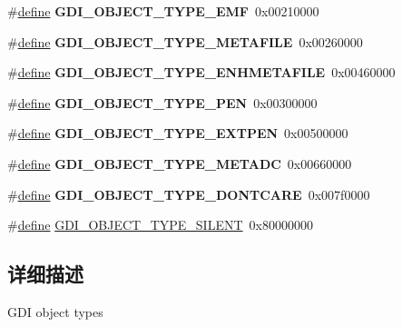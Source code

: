 \begin{DoxyCompactItemize}
\item 
\mbox{\label{group___g_d_i_gabea87e137d0dfcd80c9b603b93aa3438}} 
\#\hyperlink{structdefine}{define} {\bfseries G\+D\+I\+\_\+\+O\+B\+J\+E\+C\+T\+\_\+\+T\+Y\+P\+E\+\_\+\+E\+MF}~0x00210000
\item 
\mbox{\label{group___g_d_i_gafdfb6ccb4733cd31a673d1b51d6872a6}} 
\#\hyperlink{structdefine}{define} {\bfseries G\+D\+I\+\_\+\+O\+B\+J\+E\+C\+T\+\_\+\+T\+Y\+P\+E\+\_\+\+M\+E\+T\+A\+F\+I\+LE}~0x00260000
\item 
\mbox{\label{group___g_d_i_ga5b238eaa26f030ef5d522ce6ccffaaeb}} 
\#\hyperlink{structdefine}{define} {\bfseries G\+D\+I\+\_\+\+O\+B\+J\+E\+C\+T\+\_\+\+T\+Y\+P\+E\+\_\+\+E\+N\+H\+M\+E\+T\+A\+F\+I\+LE}~0x00460000
\item 
\mbox{\label{group___g_d_i_gaf0fc8d33f092cc32625eca05ca2a418d}} 
\#\hyperlink{structdefine}{define} {\bfseries G\+D\+I\+\_\+\+O\+B\+J\+E\+C\+T\+\_\+\+T\+Y\+P\+E\+\_\+\+P\+EN}~0x00300000
\item 
\mbox{\label{group___g_d_i_gabbc1c34ff3d4d933afd81011038c112a}} 
\#\hyperlink{structdefine}{define} {\bfseries G\+D\+I\+\_\+\+O\+B\+J\+E\+C\+T\+\_\+\+T\+Y\+P\+E\+\_\+\+E\+X\+T\+P\+EN}~0x00500000
\item 
\mbox{\label{group___g_d_i_gad76e2739496ba14697f6d764dca14947}} 
\#\hyperlink{structdefine}{define} {\bfseries G\+D\+I\+\_\+\+O\+B\+J\+E\+C\+T\+\_\+\+T\+Y\+P\+E\+\_\+\+M\+E\+T\+A\+DC}~0x00660000
\item 
\mbox{\label{group___g_d_i_ga13b10e1a5fa96fb78ac872c9ca27436b}} 
\#\hyperlink{structdefine}{define} {\bfseries G\+D\+I\+\_\+\+O\+B\+J\+E\+C\+T\+\_\+\+T\+Y\+P\+E\+\_\+\+D\+O\+N\+T\+C\+A\+RE}~0x007f0000
\item 
\#\hyperlink{structdefine}{define} \hyperlink{group___g_d_i_ga6cbd6eb7b7351c177029f5fd38225d7e}{G\+D\+I\+\_\+\+O\+B\+J\+E\+C\+T\+\_\+\+T\+Y\+P\+E\+\_\+\+S\+I\+L\+E\+NT}~0x80000000
\end{DoxyCompactItemize}


\subsection{详细描述}
G\+DI object types 

